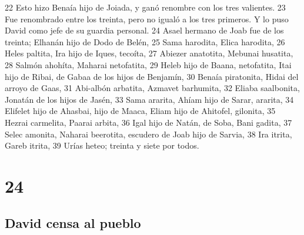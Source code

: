 22 Esto hizo Benaía hijo de Joiada, y ganó renombre con los tres valientes.
23 Fue renombrado entre los treinta, pero no igualó a los tres primeros. Y lo puso David como jefe de su guardia personal. 
24 Asael hermano de Joab fue de los treinta; Elhanán hijo de Dodo de Belén,
25 Sama harodita, Elica harodita,
26 Heles paltita, Ira hijo de Iques, tecoíta,
27 Abiezer anatotita, Mebunai husatita,
28 Salmón ahohíta, Maharai netofatita,
29 Heleb hijo de Baana, netofatita, Itai hijo de Ribai, de Gabaa de los hijos de Benjamín,
30 Benaía piratonita, Hidai del arroyo de Gaas,
31 Abi-albón arbatita, Azmavet barhumita,
32 Eliaba saalbonita, Jonatán de los hijos de Jasén,
33 Sama ararita, Ahíam hijo de Sarar, ararita, 
34 Elifelet hijo de Ahasbai, hijo de Maaca, Eliam hijo de Ahitofel, gilonita,
35 Hezrai carmelita, Paarai arbita,
36 Igal hijo de Natán, de Soba, Bani gadita,
37 Selec amonita, Naharai beerotita, escudero de Joab hijo de Sarvia,
38 Ira itrita, Gareb itrita,
39 Urías heteo; treinta y siete por todos.

\chapter{24}

\section*{David censa al pueblo}

 

